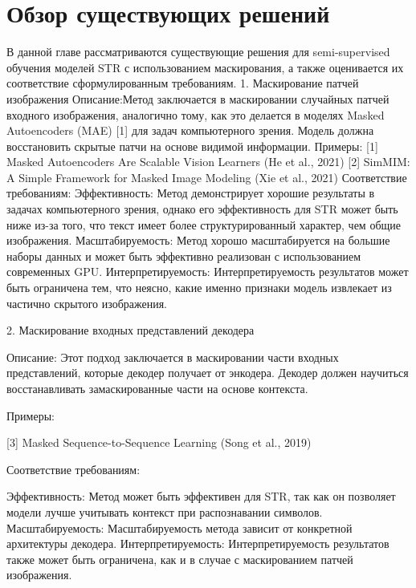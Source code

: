 \section{Обзор существующих решений}
\label{sec:Chapter2} 

В данной главе рассматриваются существующие  решения  для  semi-supervised обучения моделей STR с использованием маскирования,  а также  оценивается  их соответствие  сформулированным требованиям.
1. Маскирование патчей изображения
Описание:Метод заключается в маскировании случайных патчей входного изображения, аналогично тому, как это делается в моделях Masked Autoencoders (MAE) [1] для задач компьютерного зрения.  Модель должна восстановить скрытые патчи на основе видимой информации.
Примеры:
[1] Masked Autoencoders Are Scalable Vision Learners (He et al., 2021)
[2] SimMIM: A Simple Framework for Masked Image Modeling (Xie et al., 2021)
Соответствие требованиям:
Эффективность: Метод  демонстрирует  хорошие  результаты  в  задачах  компьютерного  зрения,  однако  его  эффективность  для  STR  может  быть  ниже  из-за  того,  что  текст  имеет  более  структурированный  характер,  чем  общие  изображения.
Масштабируемость: Метод  хорошо  масштабируется  на  большие  наборы  данных  и  может  быть  эффективно  реализован  с  использованием  современных  GPU.
Интерпретируемость: Интерпретируемость  результатов  может  быть  ограничена  тем,  что  неясно,  какие  именно  признаки  модель  извлекает  из  частично  скрытого  изображения.

2. Маскирование входных представлений декодера

Описание: Этот  подход  заключается  в  маскировании  части  входных  представлений,  которые  декодер  получает  от  энкодера.  Декодер  должен  научиться  восстанавливать  замаскированные  части  на  основе  контекста.

Примеры:

[3]  Masked Sequence-to-Sequence Learning (Song et al., 2019)

Соответствие требованиям:

Эффективность: Метод  может  быть  эффективен  для  STR,  так  как  он  позволяет  модели  лучше  учитывать  контекст  при  распознавании  символов.
Масштабируемость: Масштабируемость  метода  зависит  от  конкретной  архитектуры  декодера.
Интерпретируемость: Интерпретируемость  результатов  также  может  быть  ограничена,  как  и  в  случае  с  маскированием  патчей  изображения.

